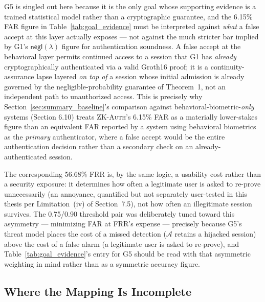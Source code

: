 \documentclass[12pt,a4paper,oneside]{report}
\begin{document}
G5 is singled out here because it is the only goal whose supporting
evidence is a trained statistical model rather than a cryptographic
guarantee, and the 6.15\% FAR figure in Table~\ref{tab:goal_evidence}
must be interpreted against \emph{what} a false accept at this layer
actually exposes --- not against the much stricter bar implied by G1's
$\mathsf{negl}(\lambda)$ figure for authentication soundness. A false
accept at the behavioral layer permits continued access to a session
that G1 has \emph{already} cryptographically authenticated via a valid
Groth16 proof; it is a continuity-assurance lapse layered \emph{on top
of} a session whose initial admission is already governed by the
negligible-probability guarantee of Theorem~1, not an independent path
to unauthorized access. This is precisely why
Section~\ref{sec:summary_baseline}'s comparison against
behavioral-biometric-\emph{only} systems (Section 6.10) treats
\textsc{ZK-Auth}'s 6.15\% FAR as a materially lower-stakes figure than
an equivalent FAR reported by a system using behavioral biometrics as
the \emph{primary} authenticator, where a false accept would be the
entire authentication decision rather than a secondary check on an
already-authenticated session.

The corresponding 56.68\% FRR is, by the same logic, a usability cost
rather than a security exposure: it determines how often a legitimate
user is asked to re-prove unnecessarily (an annoyance,
quantified but not separately user-tested in this thesis per
Limitation~(iv) of Section~7.5), not how often an illegitimate session
survives. The 0.75/0.90 threshold pair was deliberately tuned toward
this asymmetry --- minimizing FAR at FRR's expense --- precisely
because G5's threat model places the cost of a missed detection
($\mathcal{A}$ retains a hijacked session) above the cost of a false
alarm (a legitimate user is asked to re-prove), and
Table~\ref{tab:goal_evidence}'s entry for G5 should be read with that
asymmetric weighting in mind rather than as a symmetric accuracy
figure.

\subsection{Where the Mapping Is Incomplete}
\end{document}
